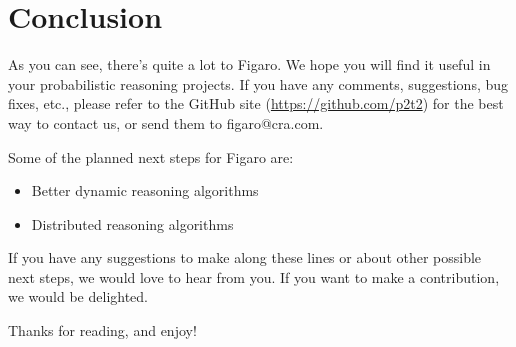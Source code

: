 
\chapter{Conclusion} %

\label{Conclusion} %


As you can see, there's quite a lot to Figaro. We hope you will find it useful in your probabilistic reasoning projects. If you have any comments, suggestions, bug fixes, etc., please refer to the GitHub site (\url{https://github.com/p2t2}) for the best way to contact us, or send them to figaro@cra.com.

Some of the planned next steps for Figaro are:
\begin{itemize}
\item Better dynamic reasoning algorithms
\item Distributed reasoning algorithms
\end{itemize}

If you have any suggestions to make along these lines or about other possible next steps, we would love to hear from you. If you want to make a contribution, we would be delighted.

Thanks for reading, and enjoy!